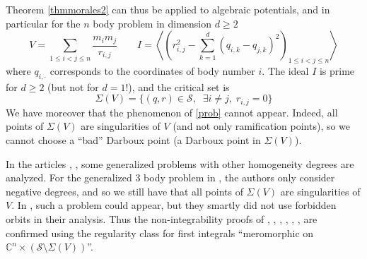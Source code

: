 \documentclass[smallcondensed]{svjour3}
\begin{document}
Theorem \ref{thmmorales2} can thus be applied to algebraic potentials, and in particular for the $n$ body problem in dimension $d\geq 2$
$$V=\sum\limits_{1\leq i<j\leq n} \frac{m_im_j}{r_{i,j}} \qquad I=\left\langle\left( r_{i,j}^2-\sum\limits_{k=1}^d (q_{i,k}-q_{j,k})^2 \right)_{1\leq i<j\leq n}\right\rangle$$
where $q_{i,\cdot}$ corresponds to the coordinates of body number $i$. The ideal $I$ is prime for $d\geq 2$ (but not for $d=1$!), and the critical set is
$$\Sigma(V)=\{(q,r)\in \mathcal{S},\;\; \exists i\neq j,\; r_{i,j}=0\}$$
We have moreover that the phenomenon of \eqref{prob} cannot appear. Indeed, all points of $\Sigma(V)$ are singularities of $V$ (and not only ramification points), so we cannot choose a ``bad'' Darboux point (a Darboux point in $\Sigma(V)$).

In the articles \cite{44}, \cite{43}, some generalized problems with other homogeneity degrees are analyzed. For the generalized $3$ body problem in \cite{44}, the authors only consider negative degrees, and so we still have that all points of $\Sigma(V)$ are singularities of $V$. In \cite{43}, such a problem could appear, but they smartly did not use forbidden orbits in their analysis. Thus the non-integrability proofs of \cite{8}, \cite{44}, \cite{9}, \cite{37}, \cite{43}, \cite{31}, \cite{45} are confirmed using the regularity class for first integrals ``meromorphic on $\mathbb{C}^n\times (\mathcal{S}\setminus \Sigma(V))$''.




\label{}


\end{document}

